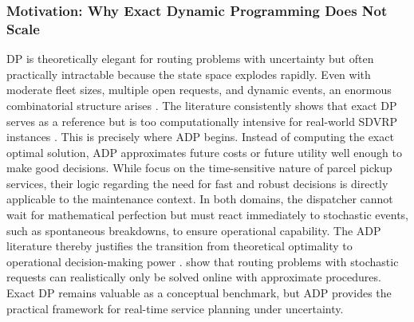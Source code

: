 \documentclass[12pt,oneside]{article}
\begin{document}
\subsubsection{Motivation: Why Exact Dynamic Programming Does Not Scale}
DP is theoretically elegant for routing problems with uncertainty but often practically intractable because the state space explodes rapidly. Even with moderate fleet sizes, multiple open requests, and dynamic events, an enormous combinatorial structure arises \citep{ulmer2017approximate}. The literature consistently shows that exact DP serves as a reference but is too computationally intensive for real-world SDVRP instances \citep{ulmer2019offline}.
This is precisely where ADP begins. Instead of computing the exact optimal solution, ADP approximates future costs or future utility well enough to make good decisions. While \citet{ulmer2018budgeting} focus on the time-sensitive nature of parcel pickup services, their logic regarding the need for fast and robust decisions is directly applicable to the maintenance context. In both domains, the dispatcher cannot wait for mathematical perfection but must react immediately to stochastic events, such as spontaneous breakdowns, to ensure operational capability. The ADP literature thereby justifies the transition from theoretical optimality to operational decision-making power \citep{mardevsic2023review}.
\citet{ulmer2019offline} show that routing problems with stochastic requests can realistically only be solved online with approximate procedures. Exact DP remains valuable as a conceptual benchmark, but ADP provides the practical framework for real-time service planning under uncertainty.
\end{document}
